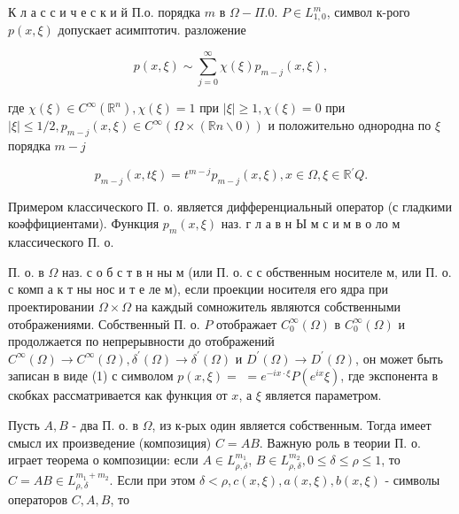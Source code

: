 \documentclass[10pt]{article}
\begin{document}
К л а с с и ч е с к и й П.о. порядка $m$ в $\Omega-\Pi .0$. $P \in L_{1,0}^{m}$, символ к-рого $p(x, \xi)$ допускает асимптотич. разложение



\[

p(x, \xi) \sim \sum_{j=0}^{\infty} \chi(\xi) p_{m-j}(x, \xi),

\]



где $\chi(\xi) \in C^{\infty}\left(\mathbb{R}^{n}\right), \chi(\xi)=1$ при $|\xi| \geqslant 1, \chi(\xi)=0$ при $|\xi| \leqslant 1 / 2, p_{m-j}(x, \xi) \in C^{\infty}(\Omega \times(\mathbb{R} n \backslash 0))$ и положительно однородна по $\xi$ порядка $m-j$



\[

p_{m-j}(x, t \xi)=t^{m-j} p_{m-j}(x, \xi), x \in \Omega, \xi \in \mathbb{R}{ }^{\prime} Q .

\]



Примером классического П. о. является дифференциальный оператор (с гладкими коәффициентами). Функция $p_{m}(x, \xi)$ наз. г л а в н Ы м с и м в о ло м классического П. о.



П. о. в $\Omega$ наз. с о б с т в н ны м (или П. о. с с обственным носителе м, или П. о. с комп а к т ны нос и т е ле м), если проекции носителя его ядра при проектировании $\Omega \times \Omega$ на каждый сомножитель являются собственными отображениями. Собственный П. о. $P$ отображает $C_{0}^{\infty}(\Omega)$ в $C_{0}^{\infty}(\Omega)$ и продолжается по непрерывности до отображений $C^{\infty}(\Omega) \rightarrow C^{\infty}(\Omega), \delta^{\prime}(\Omega) \rightarrow \delta^{\prime}(\Omega)$ и $D^{\prime}(\Omega) \rightarrow D^{\prime}(\Omega)$, он может быть записан в виде (1) с символом $p(x, \xi)=$ $=e^{-i x \cdot \xi} P\left(e^{i x} \xi\right)$, где экспонента в скобках рассматривается как функция от $x$, а $\xi$ является параметром.



Пусть $A, B$ - два П. о. в $\Omega$, из к-рых один является собственным. Тогда имеет смысл их произведение (композиция) $C=A B$. Важную роль в теории П. о. играет теорема о композиции: если $A \in L_{\rho, \delta}^{m_{1}}$, $B \in L_{\rho, \delta}^{m_{2}}, 0 \leqslant \delta \leqslant \rho \leqslant 1$, то $C=A B \in L_{\rho, \delta}^{m_{1}+m_{2}}$. Если при этом $\delta<\rho, c(x, \xi), a(x, \xi), b(x, \xi)$ - символы операторов $C, A, B$, то
\end{document}
